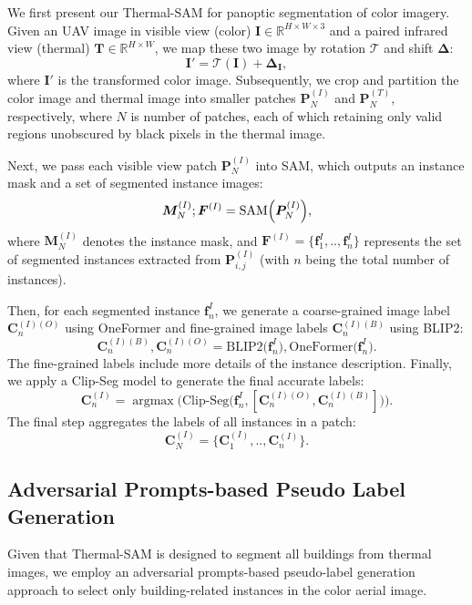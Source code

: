 \documentclass{article}
\theoremstyle{plain}
\theoremstyle{definition}
\theoremstyle{remark}
\begin{document}
We first present our Thermal-SAM for panoptic segmentation of color imagery. Given an UAV image in visible view (color) $\bm{I}\in \mathbb{R}^{H\times W \times 3}$ and a paired infrared view (thermal) $\bm{T}\in \mathbb{R}^{H\times W}$, we map these two image by rotation $\mathcal{T}$  and shift $\bm{\Delta}$:
\begin{equation}
\bm{I}' = \mathcal{T}(\bm{I}) + \bm{\Delta}_{\bm{I}},
\label{eq1}
\end{equation}
where $\bm{I}'$ is the transformed color image. Subsequently, we crop and partition the color image and thermal image into smaller patches $\bm{P}^{(I)}_N$ and $\bm{P}^{(T)}_N$, respectively, where $N$ is number of patches, each of which retaining only valid regions unobscured by black pixels in the thermal image.

Next, we pass each visible view patch $\bm{P}^{(I)}_N$ into SAM, which outputs an instance mask and a set of segmented instance images:
\begin{equation}
\bm{M}^{(I)}_N; \bm{F}^{(I)} = \text{SAM}\Bigl(\bm{P}^{(I)}_N\Bigr),
\label{eq2}
\end{equation}
where $\bm{M}^{(I)}_N$ denotes the instance mask, and $\bm{F}^{(I)} = \{\bm{f}^{I}_1,..,\bm{f}^{I}_n\}$  represents the set of segmented instances extracted from  $\bm{P}^{(I)}_{i,j}$ (with $n$ being the total number of instances).

Then, for each segmented instance $\bm{f}^{I}_n$, we generate a coarse-grained image label $\bm{C}^{(I)(O)}_n$ using OneFormer and fine-grained image labels $\bm{C}^{(I)(B)}_n$ using BLIP2:
\begin{equation}
  \bm{C}^{(I)(B)}_n, \bm{C}^{(I)(O)}_n = \text{BLIP2}\bigl(\bm{f}^{I}_n\bigr), \text{OneFormer}\bigl(\bm{f}^{I}_n\bigr).
\label{eq3}
\end{equation}
The fine-grained labels include more details of the instance description. Finally,  we apply a Clip-Seg model to generate the final accurate labels:
\begin{equation}
\bm{C}^{(I)}_n = \operatorname{argmax}\bigl(\text{Clip-Seg}\bigl(\bm{f}^{I}_n, [\bm{C}^{(I)(O)}_n,\bm{C}^{(I)(B)}_n] \bigr)\bigl).
\label{eq4}
\end{equation}
The final step aggregates the labels of all instances in a patch:
\begin{equation}
\bm{C}^{(I)}_N = \{\bm{C}^{(I)}_1,..,\bm{C}^{(I)}_n\}.
\label{eq5}
\end{equation}
\subsection{Adversarial Prompts-based Pseudo Label Generation}
Given that Thermal-SAM is designed to segment all buildings from thermal images, we employ an adversarial prompts-based pseudo-label generation approach to select only building-related instances in the color aerial image.
\end{document}
